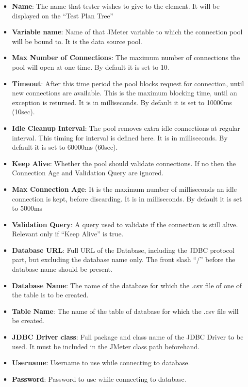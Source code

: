 \documentclass[12pt]{book}
\begin{document}
  \begin{itemize}
  \item \textbf{Name}: The name that tester wishes to give to the element. It will be displayed on the “Test Plan Tree”
  \item \textbf{Variable name}: Name of that JMeter variable to which the connection pool will be bound to. It is the data source pool. 
  \item \textbf{Max Number of Connections}: The maximum number of connections the pool will open at one time. By default it is set to 10.
  \item \textbf{Timeout}: After this time period the pool blocks request for connection, until new connections are available. This is the 
   maximum blocking time, until an exception is returned. It is in milliseconds. By default it is set to 10000ms (10sec).
  \item \textbf{Idle Cleanup Interval}: The pool removes extra idle connections at regular interval. This timing for interval is defined here.
    It is in milliseconds. By default it is set to 60000ms (60sec).
  \item \textbf{Keep Alive}: Whether the pool should validate connections. If no then the Connection Age and Validation Query are ignored.
  \item \textbf{Max Connection Age}: It is the maximum number of milliseconds an idle connection is kept, before discarding. It is in milliseconds.
    By default it is set to 5000ms
  \item \textbf{Validation Query}: A query used to validate if the connection is still alive. Relevant only if “Keep Alive” is true.
  \item \textbf{Database URL}: Full URL of the Database, including the JDBC protocol part, but excluding the database name only. The front slash “/” 
  before the database name should be present.
  \item \textbf{Database Name}: The name of the database for which the .csv file of one of the table is to be created.
  \item \textbf{Table Name}: The name of the table of database for which the .csv file will be created.
  \item \textbf{JDBC Driver class}: Full package and class name of the JDBC Driver to be used. It must be included in the JMeter class path beforehand. 
  \item \textbf{Username}: Username to use while connecting to database.
  \item \textbf{Password}: Password to use while connecting to database.
 \end{itemize}
 
\end{document}
